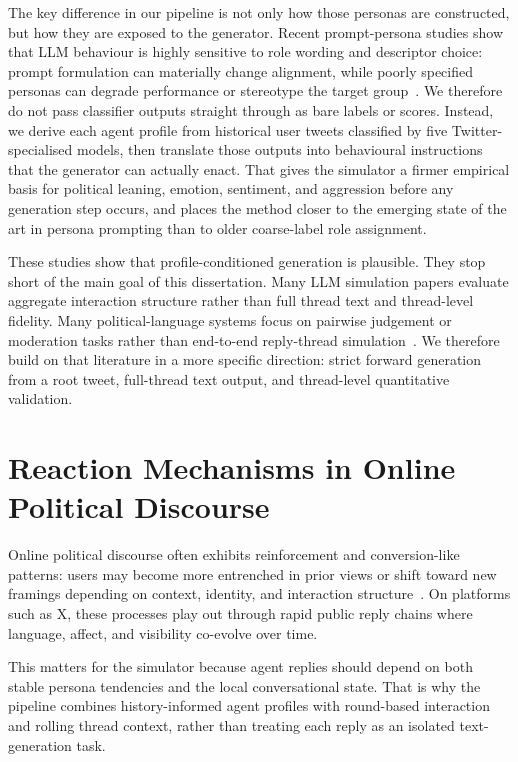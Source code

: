 \documentclass[logo,bsc,singlespacing,parskip,online]{infthesis}
\begin{document}
The key difference in our pipeline is not only how those personas are constructed, but how they are exposed to the generator. Recent prompt-persona studies show that LLM behaviour is highly sensitive to role wording and descriptor choice: prompt formulation can materially change alignment, while poorly specified personas can degrade performance or stereotype the target group~\citep{kim2024persona,lutz2025prompt}. We therefore do not pass classifier outputs straight through as bare labels or scores. Instead, we derive each agent profile from historical user tweets classified by five Twitter-specialised models, then translate those outputs into behavioural instructions that the generator can actually enact. That gives the simulator a firmer empirical basis for political leaning, emotion, sentiment, and aggression before any generation step occurs, and places the method closer to the emerging state of the art in persona prompting than to older coarse-label role assignment.

These studies show that profile-conditioned generation is plausible. They stop short of the main goal of this dissertation. Many LLM simulation papers evaluate aggregate interaction structure rather than full thread text and thread-level fidelity. Many political-language systems focus on pairwise judgement or moderation tasks rather than end-to-end reply-thread simulation~\citep{ji2018coattention,mohammadi2025aifeedback}. We therefore build on that literature in a more specific direction: strict forward generation from a root tweet, full-thread text output, and thread-level quantitative validation.

\section{Reaction Mechanisms in Online Political Discourse}
Online political discourse often exhibits reinforcement and conversion-like patterns: users may become more entrenched in prior views or shift toward new framings depending on context, identity, and interaction structure~\citep{druckman2022framework,diehl2016political}. On platforms such as X, these processes play out through rapid public reply chains where language, affect, and visibility co-evolve over time.

This matters for the simulator because agent replies should depend on both stable persona tendencies and the local conversational state. That is why the pipeline combines history-informed agent profiles with round-based interaction and rolling thread context, rather than treating each reply as an isolated text-generation task.
\end{document}
